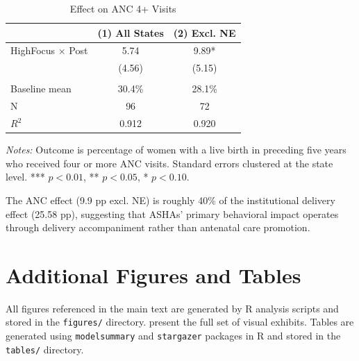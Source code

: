 \documentclass[12pt]{article}
\begin{document}
\begin{table}[H]
\centering
\caption{Effect on ANC 4+ Visits}
\label{tab:anc}
\begin{threeparttable}
\begin{tabular}{lcc}
\toprule
 & (1) All States & (2) Excl. NE \\
\midrule
HighFocus $\times$ Post & 5.74 & 9.89* \\
 & (4.56) & (5.15) \\
\\
Baseline mean & 30.4\% & 28.1\% \\
N & 96 & 72 \\
$R^2$ & 0.912 & 0.920 \\
\bottomrule
\end{tabular}
\begin{tablenotes}[flushleft]
\small
\item \textit{Notes:} Outcome is percentage of women with a live birth in preceding five years who received four or more ANC visits. Standard errors clustered at the state level. *** $p<0.01$, ** $p<0.05$, * $p<0.10$.
\end{tablenotes}
\end{threeparttable}
\end{table}

The ANC effect (9.9 pp excl. NE) is roughly 40\% of the institutional delivery effect (25.58 pp), suggesting that ASHAs' primary behavioral impact operates through delivery accompaniment rather than antenatal care promotion.


\section{Additional Figures and Tables}
\label{sec:app_exhibits}

All figures referenced in the main text are generated by R analysis scripts and stored in the \texttt{figures/} directory.  present the full set of visual exhibits. Tables are generated using \texttt{modelsummary} and \texttt{stargazer} packages in R and stored in the \texttt{tables/} directory.


\end{document}
